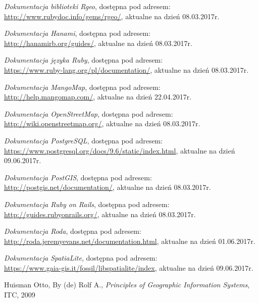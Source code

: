 \documentclass[printmode]{mgr}
\begin{document}
\begin{thebibliography}{inz}

  \emph{Dokumentacja biblioteki Rgeo}, dostępna pod adresem:\\ \url{http://www.rubydoc.info/gems/rgeo/}, aktualne na dzień 08.03.2017r.

  \emph{Dokumentacja Hanami}, dostępna pod adresem:\\ \url{http://hanamirb.org/guides/}, aktualne na dzień 08.03.2017r.

  \emph{Dokumentacja języka Ruby}, dostępna pod adresem:\\ \url{https://www.ruby-lang.org/pl/documentation/}, aktualne na dzień 08.03.2017r.

  \emph{Dokumentacja MangoMap}, dostępna pod adresem:\\ \url{http://help.mangomap.com/}, aktualne na dzień 22.04.2017r.

  \emph{Dokumentacja OpenStreetMap}, dostępna pod adresem:\\ \url{http://wiki.openstreetmap.org/}, aktualne na dzień 08.03.2017r.

  \emph{Dokumentacja PostgreSQL}, dostępna pod adresem:\\ \url{https://www.postgresql.org/docs/9.6/static/index.html}, aktualne na dzień 09.06.2017r.

  \emph{Dokumentacja PostGIS}, dostępna pod adresem:\\ \url{http://postgis.net/documentation/}, aktualne na dzień 08.03.2017r.

  \emph{Dokumentacja Ruby on Rails}, dostępna pod adresem:\\ \url{http://guides.rubyonrails.org/}, aktualne na dzień 08.03.2017r.

  \emph{Dokumentacja Roda}, dostępna pod adresem:\\ \url{http://roda.jeremyevans.net/documentation.html}, aktualne na dzień 01.06.2017r.

  \emph{Dokumentacja SpatiaLite}, dostępna pod adresem:\\ \url{https://www.gaia-gis.it/fossil/libspatialite/index}, aktualne na dzień 09.06.2017r.

  Huisman Otto, By (de) Rolf A., \emph{Principles of Geographic Information Systems}, ITC, 2009


\end{thebibliography}
\end{document}
